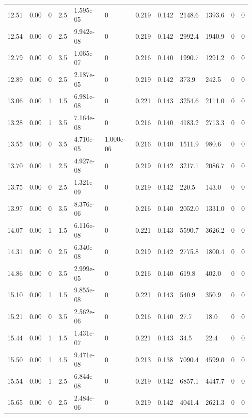 \documentclass[preview]{standalone}
\begin{document}
{{{\begin{tabular}{L{1.2cm}C{1.2cm} C{0.3cm}C{0.5cm} C{1.4cm}C{1.4cm} C{1.4cm}C{1.4cm} C{1.6cm}C{1.6cm} C{1.6cm}C{1.6cm}}
  12.51  &  0.00  & 0     & 2.5 &  1.595e-05  & 0  &  0.219&   0.142& 2148.6 & 1393.6   &  0 & 0  \\ 
  12.54  &  0.00  & 0     & 2.5 &  9.942e-08  & 0  &  0.219&   0.142& 2992.4 & 1940.9   &  0 & 0  \\ 
  12.79  &  0.00  & 0     & 3.5 &  1.065e-07  & 0  &  0.216&   0.140& 1990.7 & 1291.2   &  0 & 0  \\ 
  12.89  &  0.00  & 0     & 2.5 &  2.187e-05  & 0  &  0.219&   0.142& 373.9 & 242.5   &  0 & 0  \\ 
  13.06  &  0.00  & 1     & 1.5 &  6.981e-08  & 0  &  0.221&   0.143& 3254.6 & 2111.0   &  0 & 0  \\ 
  13.28  &  0.00  & 1     & 3.5 &  7.164e-08  & 0  &  0.216&   0.140& 4183.2 & 2713.3   &  0 & 0  \\ 
  13.55  &  0.00  & 0     & 3.5 &  4.710e-05  & 1.000e-06  &  0.216&   0.140& 1511.9 & 980.6   &  0 & 0  \\ 
  13.70  &  0.00  & 1     & 2.5 &  4.927e-08  & 0  &  0.219&   0.142& 3217.1 & 2086.7   &  0 & 0  \\ 
  13.75  &  0.00  & 0     & 2.5 &  1.321e-09  & 0  &  0.219&   0.142& 220.5 & 143.0   &  0 & 0  \\ 
  13.97  &  0.00  & 0     & 3.5 &  8.376e-06  & 0  &  0.216&   0.140& 2052.0 & 1331.0   &  0 & 0  \\ 
  14.07  &  0.00  & 1     & 1.5 &  6.116e-08  & 0  &  0.221&   0.143& 5590.7 & 3626.2   &  0 & 0  \\ 
  14.31  &  0.00  & 0     & 2.5 &  6.340e-08  & 0  &  0.219&   0.142& 2775.8 & 1800.4   &  0 & 0  \\ 
  14.86  &  0.00  & 0     & 3.5 &  2.999e-05  & 0  &  0.216&   0.140& 619.8 & 402.0   &  0 & 0  \\ 
  15.10  &  0.00  & 1     & 1.5 &  9.855e-08  & 0  &  0.221&   0.143& 540.9 & 350.9   &  0 & 0  \\ 
  15.21  &  0.00  & 0     & 3.5 &  2.562e-06  & 0  &  0.216&   0.140& 27.7 & 18.0   &  0 & 0  \\ 
  15.44  &  0.00  & 1     & 1.5 &  1.431e-07  & 0  &  0.221&   0.143& 34.5 & 22.4   &  0 & 0  \\ 
  15.50  &  0.00  & 1     & 4.5 &  9.471e-08  & 0  &  0.213&   0.138& 7090.4 & 4599.0   &  0 & 0  \\ 
  15.54  &  0.00  & 1     & 2.5 &  6.844e-08  & 0  &  0.219&   0.142& 6857.1 & 4447.7   &  0 & 0  \\ 
  15.65  &  0.00  & 0     & 2.5 &  2.484e-06  & 0  &  0.219&   0.142& 4041.4 & 2621.3   &  0 & 0  \\ 

\end{tabular}}}}
\end{document}

